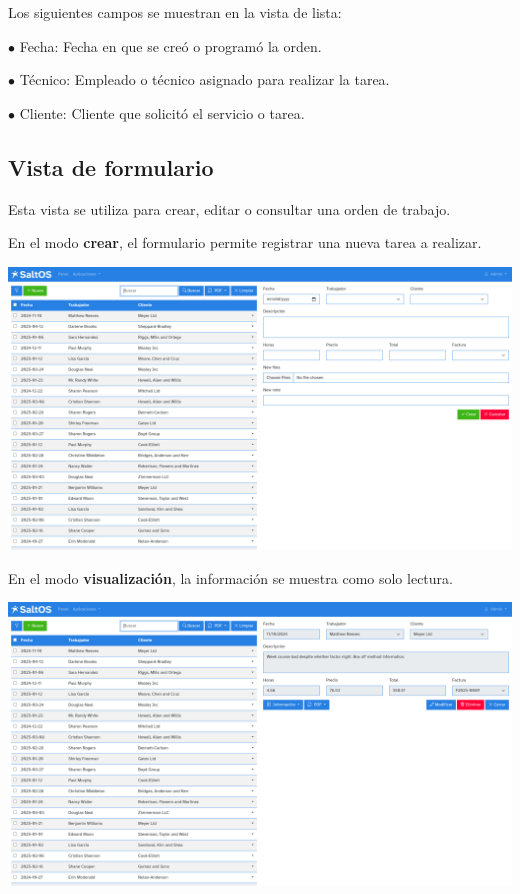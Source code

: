 \documentclass[a4paper]{article}
\begin{document}
Los siguientes campos se muestran en la vista de lista:

\begin{compactitem}
\item[\color{myblue}$\bullet$] Fecha: Fecha en que se creó o programó la orden.
\item[\color{myblue}$\bullet$] Técnico: Empleado o técnico asignado para realizar la tarea.
\item[\color{myblue}$\bullet$] Cliente: Cliente que solicitó el servicio o tarea.
\end{compactitem}

\hypertarget{toc174}{}
\subsection{Vista de formulario}

Esta vista se utiliza para crear, editar o consultar una orden de trabajo.

En el modo \textbf{crear}, el formulario permite registrar una nueva tarea a realizar.

\begin{center}\includegraphics[width=1\textwidth]{../ujest/snaps/test-screenshots-js-screenshots-sales-workorders-create-es-es-1-snap.png}\end{center}

En el modo \textbf{visualización}, la información se muestra como solo lectura.

\begin{center}\includegraphics[width=1\textwidth]{../ujest/snaps/test-screenshots-js-screenshots-sales-workorders-view-100-es-es-1-snap.png}\end{center}
\end{document}
